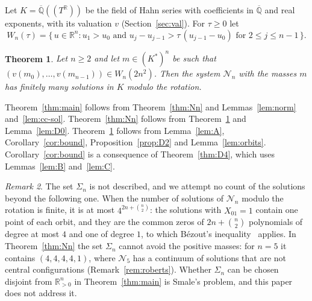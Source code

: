 \documentclass[11pt]{amsart}
\newtheorem{theorem}{Theorem}[section]
\theoremstyle{definition}
\theoremstyle{remark}
\newtheorem{remark}[theorem]{Remark}
\numberwithin{equation}{section}
\newcommand{\Qbar}{\overline{\mathbb{Q}}}
\newcommand{\RR}{\mathbb{R}}
\newcommand{\cN}{\mathcal{N}}
\begin{document}
Let $K = \Qbar((T^{\RR}))$ be the field of Hahn series with coefficients in $\Qbar$ and real exponents,
with its valuation $v$ (Section~\ref{sec:val}). For $\tau \ge 0$ let
\begin{equation}\label{eq:chamber}
  W_n(\tau) = \bigl\{\, u \in \RR^n : u_1 > u_0 \text{ and } u_j - u_{j-1} > \tau\,(u_{j-1} - u_0)
  \text{ for } 2 \le j \le n-1 \,\bigr\}.
\end{equation}

\begin{theorem}\label{thm:K}
Let $n \ge 2$ and let $m \in (K^{*})^n$ be such that $(v(m_0), \dots, v(m_{n-1})) \in W_n(2n^2)$. Then the
system $\cN_n$ with the masses $m$ has finitely many solutions in $K$ modulo the rotation.
\end{theorem}

Theorem~\ref{thm:main} follows from Theorem~\ref{thm:Nn} and Lemmas~\ref{lem:norm}
and~\ref{lem:cc-sol}. Theorem~\ref{thm:Nn} follows from Theorem~\ref{thm:K} and
Lemma~\ref{lem:D0}. Theorem~\ref{thm:K} follows from Lemma~\ref{lem:A}, Corollary~\ref{cor:bound},
Proposition~\ref{prop:D2} and Lemma~\ref{lem:orbits}. Corollary~\ref{cor:bound} is a consequence of
Theorem~\ref{thm:D4}, which uses Lemmas~\ref{lem:B} and~\ref{lem:C}.

\begin{remark}\label{rem:scope}
The set $\Sigma_n$ is not described, and we attempt no count of the solutions beyond the following one.
When the number of solutions of $\cN_n$ modulo the rotation is finite, it is at most
$4^{2n + \binom{n}{2}}$: the solutions with $X_{01} = 1$ contain one point of each orbit, and they are
the common zeros of $2n + \binom{n}{2}$ polynomials of degree at most $4$ and one of degree $1$, to
which B\'ezout's inequality~\cite{heintz1983} applies. In
Theorem~\ref{thm:Nn} the set $\Sigma_n$ cannot avoid the positive masses: for $n = 5$ it contains
$(4, 4, 4, 4, 1)$, where $\cN_5$ has a continuum of solutions that are not central configurations
(Remark~\ref{rem:roberts}). Whether $\Sigma_n$ can be chosen disjoint from $\RR_{>0}^n$ in
Theorem~\ref{thm:main} is Smale's problem, and this paper does not address it.
\end{remark}
\end{document}
